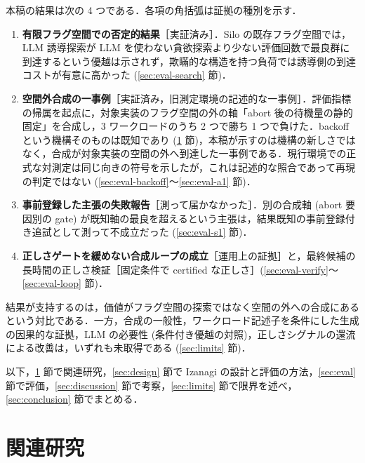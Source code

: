\documentclass[submit,techrep,noauthor]{ipsj}
\begin{document}
本稿の結果は次の 4 つである．各項の角括弧は証拠の種別を示す．
\begin{enumerate}
\item \textbf{有限フラグ空間での否定的結果}［実証済み］．Silo の既存フラグ空間では，LLM 誘導探索が LLM を使わない貪欲探索より少ない評価回数で最良群に到達するという優越は示されず，欺瞞的な構造を持つ負荷では誘導側の到達コストが有意に高かった (\ref{sec:eval-search} 節)．
\item \textbf{空間外合成の一事例}［実証済み，旧測定環境の記述的な一事例］．評価指標の帰属を起点に，対象実装のフラグ空間の外の軸「abort 後の待機量の静的固定」を合成し，3 ワークロードのうち 2 つで勝ち 1 つで負けた．backoff という機構そのものは既知であり (\ref{sec:related} 節)，本稿が示すのは機構の新しさではなく，合成が対象実装の空間の外へ到達した一事例である．現行環境での正式な対測定は同じ向きの符号を示したが，これは記述的な照合であって再現の判定ではない (\ref{sec:eval-backoff}〜\ref{sec:eval-a1} 節)．
\item \textbf{事前登録した主張の失敗報告}［測って届かなかった］．別の合成軸 (abort 要因別の gate) が既知軸の最良を超えるという主張は，結果既知の事前登録付き追試として測って不成立だった (\ref{sec:eval-s1} 節)．
\item \textbf{正しさゲートを緩めない合成ループの成立}［運用上の証拠］と，最終候補の長時間の正しさ検証［固定条件で certified な正しさ］(\ref{sec:eval-verify}〜\ref{sec:eval-loop} 節)．
\end{enumerate}
結果が支持するのは，価値がフラグ空間の探索ではなく空間の外への合成にあるという対比である．一方，合成の一般性，ワークロード記述子を条件にした生成の因果的な証拠，LLM の必要性 (条件付き優越の対照)，正しさシグナルの還流による改善は，いずれも未取得である (\ref{sec:limits} 節)．

以下，\ref{sec:related} 節で関連研究，\ref{sec:design} 節で Izanagi の設計と評価の方法，\ref{sec:eval} 節で評価，\ref{sec:discussion} 節で考察，\ref{sec:limits} 節で限界を述べ，\ref{sec:conclusion} 節でまとめる．

\section{関連研究}\label{sec:related}
\end{document}
